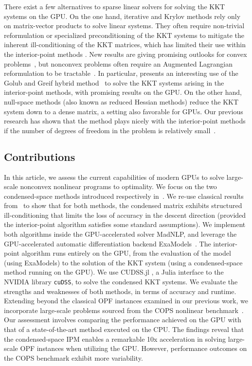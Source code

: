 There exist a few alternatives to sparse linear solvers for solving the KKT systems on the GPU.
On the one hand, iterative and Krylov methods rely only on matrix-vector products to solve linear systems.
They often require non-trivial reformulation or
specialized preconditioning of the KKT systems to mitigate the
inherent ill-conditioning of the KKT matrices, which has limited their
use within the interior-point methods
\cite{curtisNoteImplementationInteriorpoint2012,rodriguezScalablePreconditioningBlockstructured2020}.
New results are giving promising outlooks for convex problems~\cite{ghannad2022linear},
but nonconvex problems often require an Augmented Lagrangian reformulation
to be tractable~\cite{cao2016augmented,regev2023hykkt}. In particular,
\cite{regev2023hykkt} presents an interesting use of the Golub and Greif
hybrid method~\cite{golub2003solving} to solve the KKT systems arising in
the interior-point methods, with promising results on the GPU.
On the other hand, null-space methods (also known as reduced Hessian methods)
reduce the KKT system down to a dense matrix, a setting also favorable for GPUs.
Our previous research has shown that the method plays nicely with the interior-point
methods if the number of degrees of freedom in the problem is relatively small~\cite{pacaud2022condensed}.


\subsection{Contributions}
In this article, we assess the current capabilities of modern GPUs
to solve large-scale nonconvex nonlinear programs to optimality.
We focus on the two condensed-space methods
introduced respectively in~\cite{regev2023hykkt,shin2023accelerating}.
We re-use classical results from~\cite{wright1998ill} to show
that for both methods, the condensed matrix exhibits
structured ill-conditioning that limits the loss of accuracy in
the descent direction (provided the interior-point algorithm satisfies
some standard assumptions).
We implement both algorithms inside the GPU-accelerated solver MadNLP,
and leverage the GPU-accelerated automatic differentiation
backend ExaModels~\cite{shin2023accelerating}.
The interior-point algorithm runs entirely on the GPU, from
the evaluation of the model (using ExaModels) to the solution of
the KKT system (using a condensed-space method running on the GPU).
We use CUDSS.jl \cite{Montoison_CUDSS}, a Julia interface to the NVIDIA library {\tt cuDSS},
to solve the condensed KKT systems. We evaluate the strengths
and weaknesses of both methods, in terms of accuracy and runtime.
Extending beyond the classical OPF instances examined in our previous work,
we incorporate large-scale problems sourced from the COPS nonlinear benchmark~\cite{dolan2004benchmarking}.
Our assessment involves comparing the performance achieved on the GPU with that of a state-of-the-art method executed on the CPU.
The findings reveal that the condensed-space IPM enables a remarkable 10x acceleration in solving large-scale OPF instances when utilizing the GPU.
However, performance outcomes on the COPS benchmark exhibit more variability.

